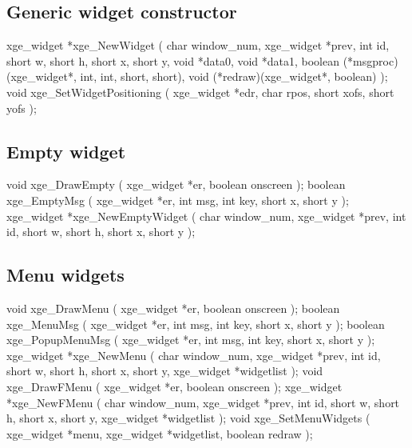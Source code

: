\subsection{Generic widget constructor}

\begin{listingC}
xge_widget *xge_NewWidget (
         char window_num, xge_widget *prev, int id,
         short w, short h, short x, short y,
         void *data0, void *data1,
         boolean (*msgproc)(xge_widget*, int, int, short, short),
         void (*redraw)(xge_widget*, boolean) );
void xge_SetWidgetPositioning ( xge_widget *edr,
                                char rpos, short xofs, short yofs );
\end{listingC}


\subsection{Empty widget}

\begin{listingC}
void xge_DrawEmpty ( xge_widget *er, boolean onscreen );
boolean xge_EmptyMsg ( xge_widget *er,
                       int msg, int key, short x, short y );
xge_widget *xge_NewEmptyWidget ( char window_num,
                                 xge_widget *prev, int id,
                                 short w, short h, short x, short y );
\end{listingC}

\subsection{Menu widgets}

\begin{listingC}
void xge_DrawMenu ( xge_widget *er, boolean onscreen );
boolean xge_MenuMsg ( xge_widget *er,
                      int msg, int key, short x, short y );
boolean xge_PopupMenuMsg ( xge_widget *er,
                           int msg, int key, short x, short y );
xge_widget *xge_NewMenu ( char window_num, xge_widget *prev,
                          int id,
                          short w, short h, short x, short y,
                          xge_widget *widgetlist );
void xge_DrawFMenu ( xge_widget *er, boolean onscreen );
xge_widget *xge_NewFMenu ( char window_num, xge_widget *prev,
                           int id,
                           short w, short h, short x, short y,
                           xge_widget *widgetlist );
void xge_SetMenuWidgets ( xge_widget *menu, xge_widget *widgetlist,
                          boolean redraw );
\end{listingC}


